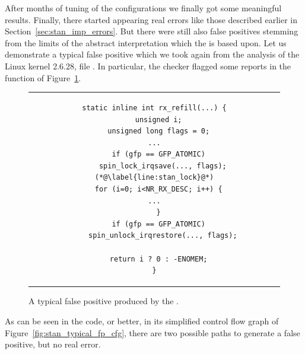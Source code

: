 After months of tuning of the configurations we finally got some meaningful
results. Finally, there started appearing real errors like those described
earlier in Section~\ref{sec:stan_imp_errors}. But there were still also false
positives stemming from the limits of the abstract interpretation which the
\AC is based upon. Let us demonstrate a typical false positive which we took
again from the analysis of the Linux kernel 2.6.28, file
. In particular, the checker flagged some reports
in the function  of Figure~\ref{fig:stan_typical_fp}.
\begin{figure}[htb]
  \begin{center}
  \begin{tabular}{c}
  \begin{lstlisting}
static inline int rx_refill(...) {
  unsigned i;
  unsigned long flags = 0;
...
  if (gfp == GFP_ATOMIC)
    spin_lock_irqsave(..., flags);(*@\label{line:stan_lock}@*)
  for (i=0; i<NR_RX_DESC; i++) {
...
  }
  if (gfp == GFP_ATOMIC)
    spin_unlock_irqrestore(..., flags);

  return i ? 0 : -ENOMEM;
}
  \end{lstlisting}
  \end{tabular}
  \end{center}
    \caption{A typical false positive produced by the \AC.}
    \label{fig:stan_typical_fp}
\end{figure}
As can be seen in the code, or better, in its simplified control flow graph of
Figure~\ref{fig:stan_typical_fp_cfg}, there are two possible paths to generate
a false positive, but no real error.
